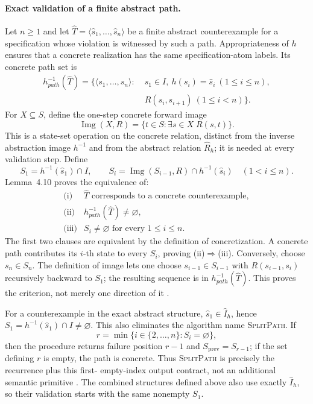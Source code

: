 \paragraph{Exact validation of a finite abstract path.}
Let \(n\geq1\) and let
\(\widehat T=\langle\widehat s_1,\ldots,\widehat s_n\rangle\)
be a finite abstract counterexample for a specification whose violation is
witnessed by such a path. Appropriateness of \(h\) ensures that a concrete
realization has the same specification-atom labels.
Its concrete path set is
\[
\begin{split}
 h^{-1}_{path}(\widehat T)=
 \{\langle s_1,\ldots,s_n\rangle:\;&s_1\in I,\ 
 h(s_i)=\widehat s_i\ (1\le i\le n),\\
 &R(s_i,s_{i+1})\ (1\le i<n)\}.
\end{split}
\]
For \(X\subseteq S\), define the one-step concrete forward image
\[
 \operatorname{Img}(X,R)
   =\{t\in S:\exists s\in X\;R(s,t)\}.
\]
This is a state-set operation on the concrete relation, distinct from the
inverse abstraction image \(h^{-1}\) and from the abstract relation
\(\widehat R_h\); it is needed at every validation step.  Define
\[
 S_1=h^{-1}(\widehat s_1)\cap I,
 \qquad
 S_i=\operatorname{Img}(S_{i-1},R)
       \cap h^{-1}(\widehat s_i)
 \quad(1<i\le n).
\]
Lemma~4.10 proves the equivalence of:
\[
\begin{array}{ll}
\text{(i)}&\widehat T\text{ corresponds to a concrete counterexample},\\
\text{(ii)}&h^{-1}_{path}(\widehat T)\ne\varnothing,\\
\text{(iii)}&S_i\ne\varnothing\text{ for every }1\le i\le n.
\end{array}
\]
The first two clauses are equivalent by the definition of concretization.  A
concrete path contributes its \(i\)-th state to every \(S_i\), proving
(ii)\(\Rightarrow\)(iii).  Conversely, choose \(s_n\in S_n\).  The definition
of image lets one choose \(s_{i-1}\in S_{i-1}\) with
\(R(s_{i-1},s_i)\) recursively backward to \(S_1\); the resulting sequence is
in \(h^{-1}_{path}(\widehat T)\).  This proves the criterion, not merely one
 direction of it \cite[lem.~4.10; pp.~772--773]{ClarkeEtAl2003}.

For a counterexample in the exact abstract structure,
\(\widehat s_1\in\widehat I_h\), hence
\(S_1=h^{-1}(\widehat s_1)\cap I\ne\varnothing\).  This also eliminates the
algorithm name \textsc{SplitPath}.  If
\[
 r=\min\{i\in\{2,\ldots,n\}:S_i=\varnothing\},
\]
then the procedure returns failure position \(r-1\) and
\(S_{\mathrm{prev}}=S_{r-1}\); if the set defining \(r\) is empty, the path is
concrete.  Thus \textsc{SplitPath} is precisely the recurrence plus this first-
empty-index output contract, not an additional semantic primitive
\cite[fig.~7; p.~773]{ClarkeEtAl2003}.
The combined structures defined above also use exactly \(\widehat I_h\), so
their validation starts with the same nonempty \(S_1\).

